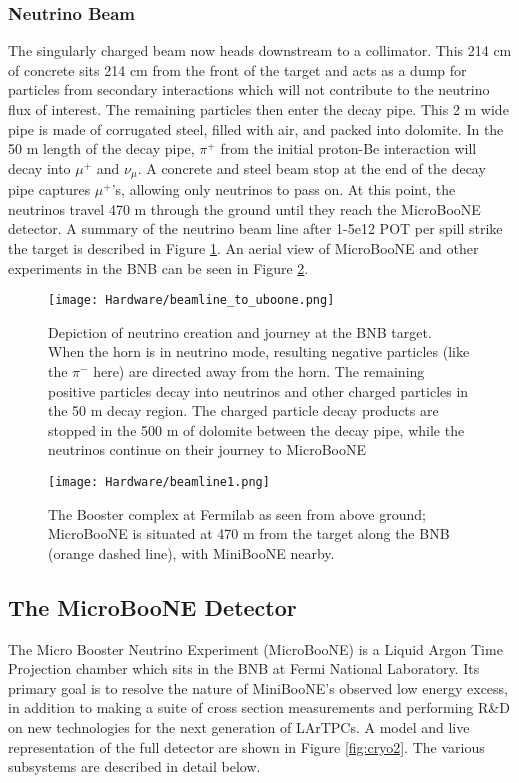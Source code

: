 \subsubsection{Neutrino Beam}
\par The singularly charged beam now heads downstream to a collimator.  This 214 cm of concrete sits 214 cm from the front of the target and acts as a dump for particles from secondary interactions which will not contribute to the neutrino flux of interest. The remaining particles then enter the decay pipe.  This 2 m wide pipe is made of corrugated steel, filled with air, and packed into dolomite. In the 50 m length of the decay pipe, $\pi^+$ from the initial proton-Be interaction will decay into $\mu^+$ and $\nu_\mu$.  A concrete and steel beam stop at the end of the decay pipe captures $\mu^+$'s, allowing only neutrinos to pass on.  At this point, the neutrinos travel 470 m through the ground until they reach the MicroBooNE detector. A summary of the neutrino beam line after 1-5e12 POT per spill strike the target is described in Figure \ref{fig:beamline2}.  An aerial view of MicroBooNE and other experiments in the BNB can be seen in Figure \ref{fig:beamline1}.

\begin{figure}[H]
\centering
\texttt{[image: Hardware/beamline\_to\_uboone.png]}
\caption{ Depiction of neutrino creation and journey at the BNB target. When the horn is in neutrino mode, resulting negative particles (like the $\pi^-$ here) are directed away from the horn.  The remaining positive particles decay into neutrinos and other charged particles in the 50 m decay region.  The charged particle decay products are stopped in the 500 m of dolomite between the decay pipe, while the neutrinos continue on their journey to MicroBooNE  }
\label{fig:beamline2}
\end{figure}


\begin{figure}[h!]
\centering
\texttt{[image: Hardware/beamline1.png]}
\caption{ The Booster complex at Fermilab as seen from above ground; MicroBooNE is situated at 470 m from the target along the BNB (orange dashed line), with MiniBooNE nearby. }
\label{fig:beamline1}
\end{figure}


\subsection{The MicroBooNE Detector}
The Micro Booster Neutrino Experiment (MicroBooNE) is a Liquid Argon Time Projection chamber which sits in the BNB at Fermi National Laboratory.  Its primary goal is to resolve the nature of MiniBooNE's observed low energy excess, in addition to making a suite of cross section measurements and performing R\&D on new technologies for the next generation of LArTPCs. A model and live representation of the full detector are shown in Figure \ref{fig:cryo2}. The various subsystems are described in detail below.

